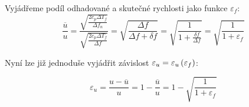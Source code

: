     Vyjádřeme podíl odhadované a skutečné rychlosti jako funkce $\varepsilon _f$:
    \begin{equation*}
        \frac{\overline{u}}{u} = \frac{\sqrt{\frac{2 c_p \Delta T_f}{\Delta f_n}}}{\sqrt{\frac{2 c_p \Delta T_f}{\Delta f}}} = \sqrt{\frac{\Delta f}{\Delta  f + \delta f}} = \sqrt{\frac{1}{1 + \frac{\delta f}{\Delta f}}} = \sqrt{\frac{1}{1+\varepsilon _f}}
    \end{equation*}

    Nyní lze již jednoduše vyjádřit závislost $\varepsilon _u = \varepsilon _u \left( \varepsilon _f \right)$:

    \begin{equation*}
        \varepsilon _u = \frac{u - \overline{u}}{u} = 1 - \frac{\overline{u}}{u} = 1 - \sqrt{\frac{1}{1+\varepsilon _f}}
    \end{equation*}